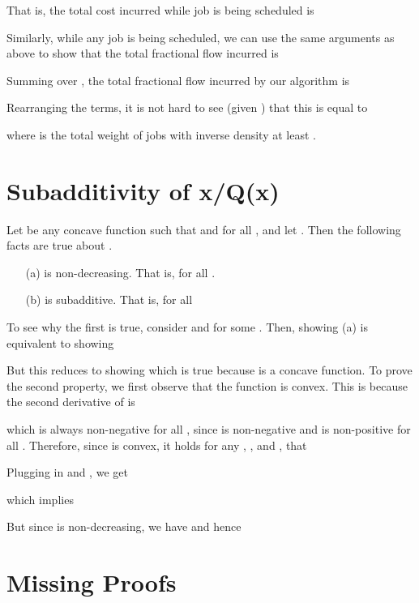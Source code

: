 \documentclass[11pt]{article}
\begin{document}
That is, the total cost incurred while job  is being scheduled is

Similarly, while any job  is being scheduled, we can use the same arguments as above to show that the total fractional flow incurred is
 
 Summing over , the total fractional flow incurred by our algorithm
 is
 
Rearranging the terms, it is not hard to see (given ) that this is equal to

where  is the total weight of jobs with inverse density at least .

\section{Subadditivity of x/Q(x)}
\label{sec:subadditive}
Let  be any concave function such that  and  for all , and let . Then the following facts are true about .
\begin{enumerate}
\item[(a)]  is non-decreasing. That is,  for all .
\item[(b)]  is subadditive. That is,  for all 
\end{enumerate}

To see why the first is true, consider  and  for some . Then,
showing (a) is equivalent to showing

But this reduces to showing  which is true because  is a concave function. To prove the second property, we first observe that the function  is convex. This is because the second derivative of  is

which is always non-negative for all , since  is non-negative and  is non-positive for all . Therefore, since  is convex, it holds for any , , and ,  that

Plugging in  and , we get

which implies

But since  is non-decreasing, we have  and hence



\section{Missing Proofs}
\label{sec:missing-proofs}
\end{document}
